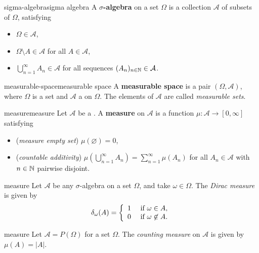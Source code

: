 \begin{topic}{sigma-algebra}{sigma algebra}
    A \textbf{$\sigma$-algebra} on a set $\Omega$ is a collection $\mathcal{A}$ of subsets of $\Omega$, satisfying
    \begin{itemize}
        \item $\Omega \in \mathcal{A}$,
        \item $\Omega \setminus A \in \mathcal{A}$ for all $A \in \mathcal{A}$,
        \item $\bigcup_{n = 1}^\infty A_n \in \mathcal{A}$ for all sequences $(A_n)_{n \in \mathbb{N}} \in \mathcal{A}$.
    \end{itemize}
\end{topic}

\begin{topic}{measurable-space}{measurable space}
    A \textbf{measurable space} is a pair $(\Omega, \mathcal{A})$, where $\Omega$ is a set and $\mathcal{A}$ a  on $\Omega$. The elements of $\mathcal{A}$ are called \textit{measurable sets}.
\end{topic}

\begin{topic}{measure}{measure}
    Let $\mathcal{A}$ be a . A \textbf{measure} on $\mathcal{A}$ is a function $\mu : \mathcal{A} \to [0, \infty]$ satisfying
    \begin{itemize}
        \item (\textit{measure empty set}) $\mu(\varnothing) = 0$,
        \item (\textit{countable additivity}) $\mu(\bigcup_{n = 1}^\infty A_n) = \sum_{n = 1}^\infty \mu(A_n)$ for all $A_n \in \mathcal{A}$ with $n \in \mathbb{N}$ pairwise disjoint.
    \end{itemize}
\end{topic}

\begin{example}{measure}
    Let $\mathcal{A}$ be any $\sigma$-algebra on a set $\Omega$, and take $\omega \in \Omega$. The \textit{Dirac measure} is given by
    \[ \delta_\omega(A) = \left\{ \begin{array}{cl} 1 & \textup{ if } \omega \in A, \\ 0 & \textup{ if } \omega \not\in A . \end{array} \right. \]
\end{example}

\begin{example}{measure}
    Let $\mathcal{A} = P(\Omega)$ for a set $\Omega$. The \textit{counting measure} on $\mathcal{A}$ is given by $\mu(A) = |A|$.
\end{example}

